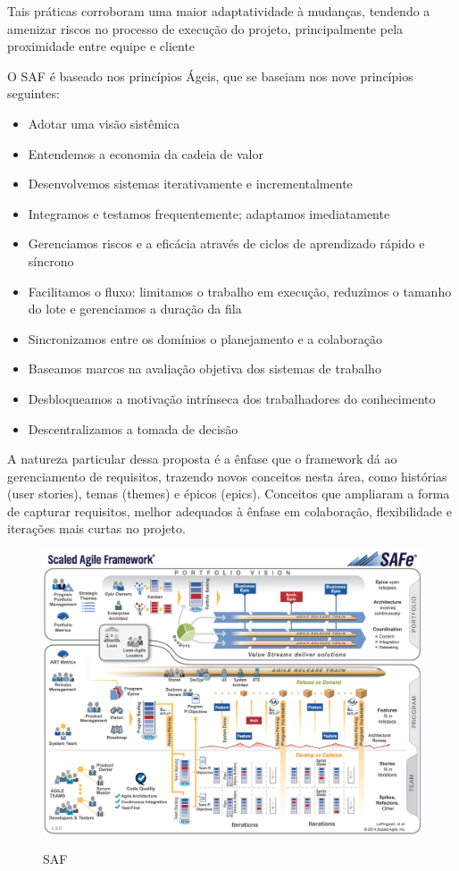 Tais práticas corroboram uma maior adaptatividade à mudanças, tendendo a amenizar riscos no processo de execução do projeto, principalmente pela proximidade entre equipe e cliente \cite{boehm2002}

O SAF é baseado nos princípios Ágeis, que se baseiam nos nove princípios seguintes:


\begin{itemize}
\item Adotar uma visão sistêmica
\item Entendemos a economia da cadeia de valor
\item Desenvolvemos sistemas iterativamente e incrementalmente
\item Integramos e testamos frequentemente; adaptamos imediatamente
\item Gerenciamos riscos e a eficácia através de ciclos de aprendizado rápido e síncrono
\item Facilitamos o fluxo: limitamos o trabalho em execução, reduzimos o tamanho do lote e gerenciamos a duração da fila
\item Sincronizamos entre os domínios o planejamento e a colaboração
\item Baseamos marcos na avaliação objetiva dos sistemas de trabalho
\item Desbloqueamos a motivação intrínseca dos trabalhadores do conhecimento
\item Descentralizamos a tomada de decisão
\end{itemize}

A natureza particular dessa proposta é a ênfase que o framework dá ao gerenciamento de requisitos, trazendo novos conceitos nesta área, como histórias (user stories), temas (themes) e épicos (epics). Conceitos que ampliaram a forma de capturar requisitos, melhor adequados à ênfase em colaboração, flexibilidade e iterações mais curtas no projeto. \cite{MELLO}

\FloatBarrier
\begin{figure}[!htpd]
		\centering
		\includegraphics[scale=0.27]{figuras/SAF}
		\label{img:SAF}
		\caption{SAF}
\end{figure}
\FloatBarrier


